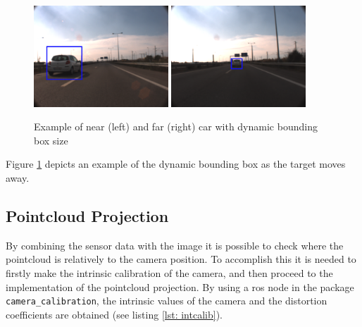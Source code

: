 \begin{figure}[htp]
	
	\centering
	\includegraphics[width=0.45\textwidth]{caplabel/imgs/boxds1.png}
	\includegraphics[width=0.45\textwidth]{caplabel/imgs/boxds2.png}
	
	\caption{Example of near (left) and far (right) car with dynamic bounding box size}
	\label{fig:dsize}
	
\end{figure}

Figure \ref{fig:dsize} depicts an example of the dynamic bounding box as the target moves away.

\subsection{Pointcloud Projection}

By combining the sensor data with the image it is possible to check where the pointcloud is relatively to the camera position. To accomplish this it is needed to firstly make the intrinsic calibration of the camera, and then proceed to the implementation of the pointcloud projection. By using a \gls{ros} node in the package \texttt{camera\_calibration}, the intrinsic values of the camera and the distortion coefficients are obtained (see listing \ref{lst: intcalib}).

